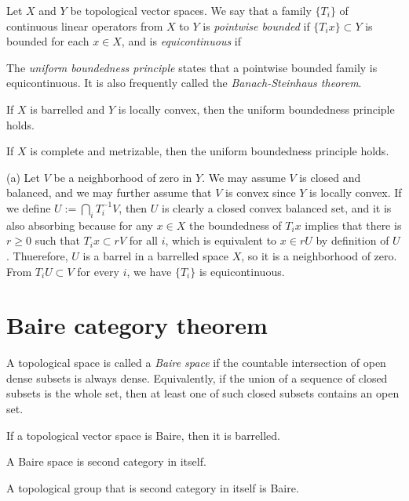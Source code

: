 \documentclass{../../large}
\begin{document}
\begin{prb}
Let $X$ and $Y$ be topological vector spaces.
We say that a family $\{T_i\}$ of continuous linear operators from $X$ to $Y$ is \emph{pointwise bounded} if $\{T_ix\}\subset Y$ is bounded for each $x\in X$, and is \emph{equicontinuous} if 

The \emph{uniform boundedness principle} states that a pointwise bounded family is equicontinuous.
It is also frequently called the \emph{Banach-Steinhaus theorem}.
\begin{parts}
\item If $X$ is barrelled and $Y$ is locally convex, then the uniform boundedness principle holds.
\item If $X$ is complete and metrizable, then the uniform boundedness principle holds.
\end{parts}
\end{prb}
\begin{pf}
(a)
Let $V$ be a neighborhood of zero in $Y$.
We may assume $V$ is closed and balanced, and we may further assume that $V$ is convex since $Y$ is locally convex.
If we define $U:=\bigcap_iT_i^{-1}V$, then $U$ is clearly a closed convex balanced set, and it is also absorbing because for any $x\in X$ the boundedness of $T_ix$ implies that there is $r\ge0$ such that $T_ix\subset rV$ for all $i$, which is equivalent to $x\in rU$ by definition of $U$.
Thuerefore, $U$ is a barrel in a barrelled space $X$, so it is a neighborhood of zero.
From $T_iU\subset V$ for every $i$, we have $\{T_i\}$ is equicontinuous.
\end{pf}



\section{Baire category theorem}

\begin{prb}
A topological space is called a \emph{Baire space} if the countable intersection of open dense subsets is always dense.
Equivalently, if the union of a sequence of closed subsets is the whole set, then at least one of such closed subsets contains an open set.
\begin{parts}
\item If a topological vector space is Baire, then it is barrelled.
\item A Baire space is second category in itself.
\item A topological group that is second category in itself is Baire.
\end{parts}
\end{prb}
\end{document}
